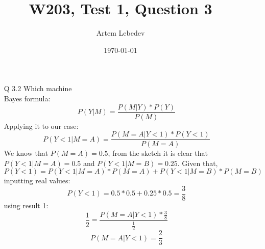 \documentclass{article}
\author{Artem Lebedev}
\title{W203, Test 1, Question 3}
\date{\today}
\begin{document}
\maketitle

\begin{enumerate}

\item[Q 3.2] Which machine\\
Bayes formula:
$$ P(Y|M) = \frac{P(M|Y)*P(Y)}{P(M)}$$
Applying it to our case:
	\begin{equation}
	 P(Y<1|M=A) = \frac{P(M=A|Y<1)*P(Y<1)}{P(M=A)}
	\end{equation}
We know that $P(M = A) = 0.5$, from the sketch it is clear that $P(Y<1|M=A) = 0.5$ and $P(Y<1|M=B) = 0.25$.
Given that, $$P(Y<1) = P(Y<1|M=A)*P(M=A) + P(Y<1|M=B)*P(M=B)$$
inputting real values:
$$P(Y<1) = 0.5*0.5+0.25*0.5 = \frac{3}{8}$$
using result 1:
 $$\frac{1}{2} = \frac{P(M=A|Y<1)*\frac{3}{8}}{\frac{1}{2}}$$
 $$P(M=A|Y<1) = \frac{2}{3}$$
\end{enumerate}
\end{document}
